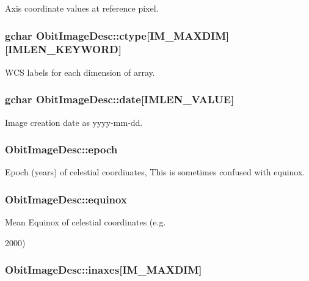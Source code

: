Axis coordinate values at reference pixel. 

\subsubsection{\setlength{\rightskip}{0pt plus 5cm}gchar {\bf Obit\-Image\-Desc::ctype}[IM\_\-MAXDIM][IMLEN\_\-KEYWORD]}\label{structObitImageDesc_o7}


WCS labels for each dimension of array. 

\subsubsection{\setlength{\rightskip}{0pt plus 5cm}gchar {\bf Obit\-Image\-Desc::date}[IMLEN\_\-VALUE]}\label{structObitImageDesc_o22}


Image creation date as yyyy-mm-dd. 

\subsubsection{ {\bf Obit\-Image\-Desc::epoch}}\label{structObitImageDesc_o25}


Epoch (years) of celestial coordinates, This is sometimes confused with equinox. 

\subsubsection{ {\bf Obit\-Image\-Desc::equinox}}\label{structObitImageDesc_o26}


Mean Equinox of celestial coordinates (e.g. 

2000) 
\subsubsection{ {\bf Obit\-Image\-Desc::inaxes}[IM\_\-MAXDIM]}\label{structObitImageDesc_o6}


